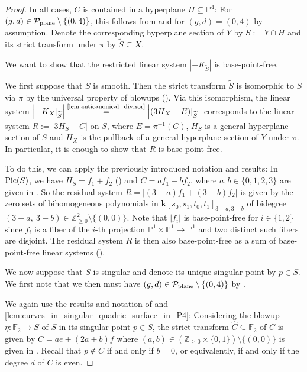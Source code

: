 \documentclass[english,11pt,reqno]{amsart}
\newcommand{\sub}{\subseteq}
\newcommand{\Pone}{\mathbb{P}^1}
\newcommand{\Pfour}{\mathbb{P}^4}
\newcommand{\PxP}{\mathbb{P}^1 \times \mathbb{P}^1}
\newcommand{\kk}{\mathbf{k}}
\newcommand{\kPxP}{\kk[s_0,s_1,t_0,t_1]}
\newcommand{\Z}{\mathbb{Z}}
\newcommand{\Pic}{\textup{Pic}}
\newcommand{\Ftwo}{\mathbb{F}_2}
\begin{document}
%
%
\begin{proof}
In all cases, $C$ is contained in a hyperplane $H \sub \Pfour$: For $(g,d)\in\mathcal{P}_{\textup{plane}}\setminus\{(0,4)\}$, this follows from  and for $(g,d)=(0,4)$ by assumption. Denote the corresponding hyperplane section of $Y$ by $S:=Y\cap H$ and its strict transform under $\pi$ by $\widetilde{S}\sub X$.\par 
We want to show that the restricted linear system $|-K_{\widetilde{S}}|$ is base-point-free.\par 
We first suppose that $S$ is smooth. Then the strict transform $\widetilde{S}$ is isomorphic to $S$ via $\pi$ by the universal property of blowups (). Via this isomorphism, the linear system $ \left |-K_X|_{\widetilde{S}}\right|\overset{\textup{\ref{lem:anticanonical_divisor}}}{=} \left|(3 H_X-E )|_{\widetilde{S}}\right|$ corresponds to the linear system $R:= |3H_S-C|$ on $S$, where $E=\pi^{-1}(C)$, $H_S$ is a general hyperplane section of $S$ and $H_X$ is the pullback of a general hyperplane section of $Y$ under $\pi $. In particular, it is enough to show that $R$ is base-point-free.\par 
To do this, we can apply the previously introduced notation and results: In $\Pic(S)$, we have $H_S=f_1+f_2$ () and $C=af_1+bf_2$, where $a,b\in\{0,1,2,3\}$ are given in . So the residual system $R=|(3-a)f_1+(3-b)f_2|$ is given by the zero sets of bihomogeneous polynomials in $\kPxP_{3-a,3-b}$ of bidegree $(3-a,\:3-b)\in \Z_{\geq 0}^2\setminus \{(0,0)\}$. Note that $|f_i|$ is base-point-free for $i\in\{1,2\}$ since $f_i$ is a fiber of the $i$-th projection $\PxP\rightarrow \Pone$ and two distinct such fibers are disjoint. The residual system $R$ is then also base-point-free as a sum of base-point-free linear systems (). 
\par 
We now suppose that $S$ is singular and denote its unique singular point by $p\in S$. We first note that we then must have $(g,d)\in \mathcal{P}_{\textup{plane}}\setminus\{(0,4)\}$ by . \par
We again use the results and notation of  and \ref{lem:curves_in_singular_quadric_surface_in_P4}: Considering the blowup $\eta:\Ftwo \rightarrow S$ of $S$ in its singular point $p\in S$, the strict transform $\hat{C}\sub \Ftwo$ of $C$ is given by $\hat{C}=ae + (2a+b)f$ where $(a,b)\in \left(\Z_{\geq 0} \times \{0,1\}\right) \setminus \{(0,0)\}$ is given in .  Recall that $p\not\in C$ if and only if $b=0$, or equivalently, if and only if the degree $d$ of $C$ is even. \par 

\end{proof}
\end{document}
